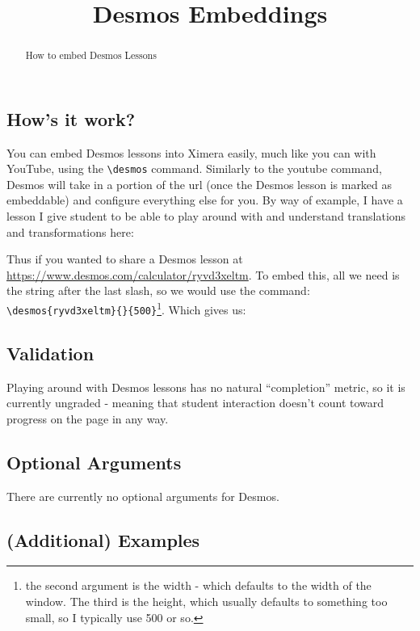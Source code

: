 \documentclass{ximera}
\title{Desmos Embeddings}
\begin{document}
\begin{abstract}
    How to embed Desmos Lessons
\end{abstract}
\maketitle

    \subsection*{How's it work?}
    
        You can embed Desmos lessons into Ximera easily, much like you can with YouTube, using the \verb|\desmos| command. Similarly to the youtube command, Desmos will take in a portion of the url (once the Desmos lesson is marked as embeddable) and configure everything else for you. By way of example, I have a lesson I give student to be able to play around with and understand translations and transformations here: 
        
        Thus if you wanted to share a Desmos lesson at \url{https://www.desmos.com/calculator/ryvd3xeltm}. To embed this, all we need is the string after the last slash, so we would use the command: \\ \verb|\desmos{ryvd3xeltm}{}{500}|\footnote{the second argument is the width - which defaults to the width of the window. The third is the height, which usually defaults to something too small, so I typically use 500 or so.}. Which gives us:
    
    
    \subsection*{Validation}
        Playing around with Desmos lessons has no natural ``completion'' metric, so it is currently ungraded - meaning that student interaction doesn't count toward progress on the page in any way.
    
        
    \subsection*{Optional Arguments}
        There are currently no optional arguments for Desmos.
    
    \subsection*{(Additional) Examples}
    
\end{document}
